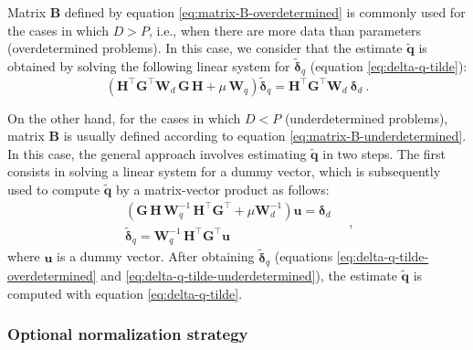 Matrix $\mathbf{B}$ defined by equation \ref{eq:matrix-B-overdetermined} is commonly used for the cases in which $D > P$, i.e., when
there are more data than parameters (overdetermined problems).
In this case, we consider that the estimate $\tilde{\mathbf{q}}$ is obtained by solving the following linear system
for $\tilde{\boldsymbol{\delta}}_{q}$ (equation \ref{eq:delta-q-tilde}):
\begin{equation}
	\left( \mathbf{H}^{\top} \mathbf{G}^{\top} \mathbf{W}_{d} \, \mathbf{G} \, \mathbf{H} + 
	\mu \, \mathbf{W}_{q} \right) 
	\tilde{\boldsymbol{\delta}}_{q} = 
	\mathbf{H}^{\top} \mathbf{G}^{\top} \mathbf{W}_{d} \: 
	\boldsymbol{\delta}_{d} \: .
	\label{eq:delta-q-tilde-overdetermined}
\end{equation}

On the other hand, for the cases in which $D < P$ (underdetermined problems), matrix $\mathbf{B}$ is 
usually defined according to equation \ref{eq:matrix-B-underdetermined}. In this case, the general approach involves 
estimating $\tilde{\mathbf{q}}$ in two steps. The first consists in solving a linear system 
for a dummy vector, which is subsequently used to compute $\tilde{\mathbf{q}}$ by a matrix-vector product as follows:
\begin{equation}
	\begin{split}
		\left( \mathbf{G} \, \mathbf{H} \, \mathbf{W}_{q}^{-1} \,
		\mathbf{H}^{\top}\mathbf{G}^{\top} + \mu \mathbf{W}_{d}^{-1} \right)  
		\mathbf{u} = \boldsymbol{\delta}_{d} \\
		\tilde{\boldsymbol{\delta}}_{q} = \mathbf{W}_{q}^{-1} \, \mathbf{H}^{\top} \mathbf{G}^{\top} \mathbf{u}
	\end{split} \quad ,
	\label{eq:delta-q-tilde-underdetermined}
\end{equation}
where $\mathbf{u}$ is a dummy vector.
After obtaining $\tilde{\boldsymbol{\delta}}_{q}$ (equations \ref{eq:delta-q-tilde-overdetermined} and \ref{eq:delta-q-tilde-underdetermined}),
the estimate $\tilde{\mathbf{q}}$ is computed with equation \ref{eq:delta-q-tilde}.

\subsubsection{Optional normalization strategy}
\label{subsubsec:normalization}

